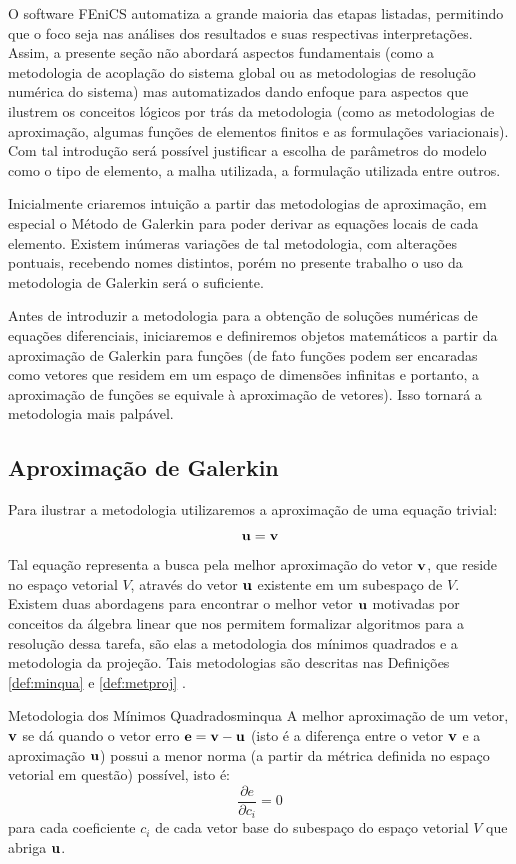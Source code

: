   O software FEniCS \cite{AlnaesBlechta2015a} automatiza a grande maioria das
  etapas listadas, permitindo que o foco seja nas análises dos resultados e suas
  respectivas interpretações. Assim, a presente seção não abordará aspectos
  fundamentais (como a metodologia de acoplação do sistema global ou as
  metodologias de resolução numérica do sistema) mas automatizados dando enfoque
  para aspectos que ilustrem os conceitos lógicos por trás da metodologia (como
  as metodologias de aproximação, algumas funções de elementos finitos e as
  formulações variacionais). Com  tal introdução será possível justificar a
  escolha de parâmetros do modelo como o tipo de elemento, a malha utilizada, a
  formulação utilizada entre outros.
  
  Inicialmente criaremos intuição a partir das metodologias de aproximação, em
  especial o Método de Galerkin para poder derivar as equações locais de cada
  elemento. Existem inúmeras variações de tal metodologia, com alterações
  pontuais, recebendo nomes distintos, porém no presente trabalho o uso da
  metodologia de Galerkin será o suficiente.

  Antes de introduzir a metodologia para a obtenção de soluções numéricas de equações diferenciais, iniciaremos e definiremos objetos matemáticos a partir da aproximação de Galerkin para funções (de fato funções podem ser encaradas como vetores que residem em um espaço de dimensões infinitas e portanto, a aproximação de funções se equivale à aproximação de vetores). Isso tornará a metodologia mais palpável.

  \subsection{Aproximação de Galerkin}
  Para ilustrar a metodologia utilizaremos a aproximação de uma equação trivial: 
  \begin{equation}
  \bm{\mathrm{u}} = \bm{\mathrm{v}} 
  \end{equation}
    Tal equação representa a busca pela melhor aproximação do vetor $\bm{\mathrm{v}}$, que
    reside no espaço vetorial $V$, através do vetor $\bm{\mathrm{u}}$ existente em um
    subespaço de $V$. Existem duas abordagens para encontrar o melhor vetor $\bm{\mathrm{u}}$ motivadas por conceitos da álgebra linear que nos permitem formalizar algoritmos para a resolução dessa tarefa, são elas a metodologia dos mínimos quadrados e a metodologia da projeção. Tais metodologias são descritas nas Definições \ref{def:minqua} e \ref{def:metproj} .

  \begin{Definition}{Metodologia dos Mínimos Quadrados}{minqua}
  A melhor aproximação de um vetor, $\bm{\mathrm{v}}$ se dá quando o vetor erro $\bm{\mathrm{e}} =
  \bm{\mathrm{v}} - \bm{\mathrm{u}}$ (isto é a diferença entre o vetor $\bm{\mathrm{v}}$ e a aproximação
  $\bm{\mathrm{u}}$) possui a menor norma (a partir da métrica definida no espaço vetorial
  em questão) possível, isto é: $$\frac{\partial e}{\partial c_i} = 0 $$ para
  cada coeficiente $c_i$ de cada vetor base do subespaço do espaço vetorial $V$ que abriga $\bm{\mathrm{u}}$.
  \end{Definition}

